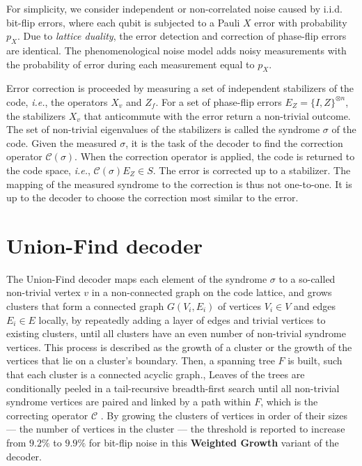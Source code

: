 For simplicity, we consider independent or non-correlated noise caused by i.i.d. bit-flip errors, where each qubit is subjected to a Pauli $X$ error with probability $p_X$. Due to \emph{lattice duality}, the error detection and correction of phase-flip errors are identical. The phenomenological noise model adds noisy measurements with the probability of error during each measurement equal to $p_X$. 

Error correction is proceeded by measuring a set of independent stabilizers of the code, \emph{i.e.}, the operators $X_v$ and $Z_f$. For a set of phase-flip errors $E_Z = \{I,Z\}^{\otimes n}$, the stabilizers $X_v$ that anticommute with the error return a non-trivial outcome. The set of non-trivial eigenvalues of the stabilizers is called the syndrome $\sigma$ of the code. Given the measured $\sigma$, it is the task of the decoder to find the correction operator $\mathcal{C}(\sigma)$. When the correction operator is applied, the code is returned to the code space, \emph{i.e.}, $\mathcal{C}(\sigma)E_Z \in S$. The error is corrected up to a stabilizer. The mapping of the measured syndrome to the correction is thus not one-to-one. It is up to the decoder to choose the correction most similar to the error. 

\section{Union-Find decoder}\label{sec:unionfind}

The Union-Find decoder \cite{delfosse2017almost} maps each element of the syndrome $\sigma$ to a so-called non-trivial vertex $v$ in a non-connected graph on the code lattice, and grows clusters that form a connected graph $G(V_i, E_i)$ of vertices $V_i\in V$ and edges $E_i \in E$ locally, by repeatedly adding a layer of edges and trivial vertices to existing clusters, until all clusters have an even number of non-trivial syndrome vertices. This process is described as the growth of a cluster or the growth of the vertices that lie on a cluster's boundary. Then, a spanning tree $F$ is built, such that each cluster is a connected acyclic graph., Leaves of the trees are conditionally peeled in a tail-recursive breadth-first search until all non-trivial syndrome vertices are paired and linked by a path within $F$, which is the correcting operator $\mathcal{C}$ \cite{delfosse2017linear}. By growing the clusters of vertices in order of their sizes --- the number of vertices in the cluster --- the threshold is reported to increase from $9.2\%$ to $9.9\%$ for bit-flip noise in this \textbf{Weighted Growth} variant of the decoder.

